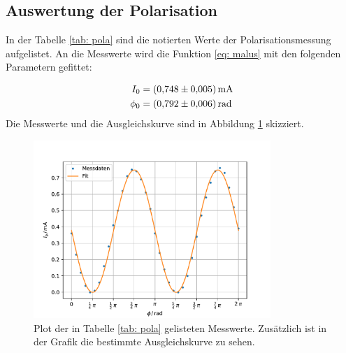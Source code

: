 \subsection{Auswertung der Polarisation}

In der Tabelle \ref{tab: pola} sind die notierten Werte der Polarisationsmessung
aufgelistet.
\FloatBarrier
An die Messwerte wird die Funktion \eqref{eq: malus} %
mit den folgenden Parametern gefittet:

\begin{align}
  \label{eq: fit_pola}
  \begin{aligned}
  I_0&=\SI{0.748\pm0.005}{\milli\ampere}\\ %
  \phi_0&=\SI{0.792\pm0.006}{\radian}
\end{aligned}
\end{align}
Die Messwerte und die Ausgleichskurve sind in Abbildung \ref{fig: pola} skizziert.

\begin{figure}[h!]
  \centering
  \includegraphics[width=0.8\textwidth]{../Messdaten/plots/pola.pdf}
  \caption{Plot der in Tabelle \ref{tab: pola} gelisteten Messwerte. Zusätzlich ist in der Grafik die bestimmte Ausgleichskurve zu sehen.}
  \label{fig: pola}
\end{figure}
\FloatBarrier

\FloatBarrier
